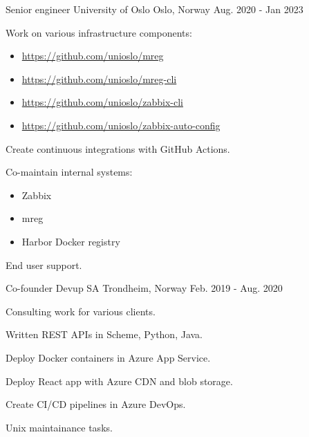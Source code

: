 

\begin{cventries}

  \cventry
    {Senior engineer} %
    {University of Oslo}
    {Oslo, Norway} %
    {Aug. 2020 - Jan 2023} %
    {
      \begin{cvitems}
        \item {Work on various infrastructure components:}
          \begin{itemize}[leftmargin=2ex, nosep, noitemsep]
          \item \url{https://github.com/unioslo/mreg}
          \item \url{https://github.com/unioslo/mreg-cli}
          \item \url{https://github.com/unioslo/zabbix-cli}
          \item \url{https://github.com/unioslo/zabbix-auto-config}
          \end{itemize}
        \item {Create continuous integrations with GitHub Actions.}
        \item {Co-maintain internal systems:}
          \begin{itemize}[leftmargin=2ex, nosep, noitemsep]
          \item {Zabbix}
          \item {mreg}
          \item {Harbor Docker registry}
          \end{itemize}
        \item {End user support.}
      \end{cvitems}
    }



  \cventry
    {Co-founder} %
    {Devup SA}
    {Trondheim, Norway} %
    {Feb. 2019 - Aug. 2020} %
    {
      \begin{cvitems} %
        \item {Consulting work for various clients.}
        \item {Written REST APIs in Scheme, Python, Java.}
        \item {Deploy Docker containers in Azure App Service.}
        \item {Deploy React app with Azure CDN and blob storage.}
        \item {Create CI/CD pipelines in Azure DevOps.}
        \item {Unix maintainance tasks.}
      \end{cvitems}
    }


\end{cventries}
